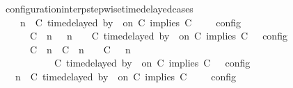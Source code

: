 \begin{isabellebody}
\isamarkupfalse%
%
\endisatagproof
{\isafoldproof}%
%
\isadelimproof
\isanewline
%
\endisadelimproof
\isanewline
{}\isamarkupfalse%
\ configuration{\isacharunderscore}interp{\isacharunderscore}stepwise{\isacharunderscore}timedelayed{\isacharunderscore}cases{\isacharcolon}\isanewline
\ \ {\isacartoucheopen}{\isasymlbrakk}\ {\isasymGamma}{\isacharcomma}\ n\ {\isasymturnstile}\ {\isacharparenleft}{\isacharparenleft}C\ time{\isacharminus}delayed\ by\ {\isasymdelta}{\isasymtau}\ on\ C\ implies\ C\ {\isacharhash}\ {\isasymPsi}{\isacharparenright}\ {\isasymtriangleright}\ {\isasymPhi}\ {\isasymrbrakk}\isactrlsub c\isactrlsub o\isactrlsub n\isactrlsub f\isactrlsub i\isactrlsub g\isanewline
\ \ \ \ {\isacharequal}\ {\isasymlbrakk}\ {\isacharparenleft}{\isacharparenleft}C\ {\isasymnot}{\isasymUp}\ n{\isacharparenright}\ {\isacharhash}\ {\isasymGamma}{\isacharparenright}{\isacharcomma}\ n\ {\isasymturnstile}\ {\isasymPsi}\ {\isasymtriangleright}\ {\isacharparenleft}{\isacharparenleft}C\ time{\isacharminus}delayed\ by\ {\isasymdelta}{\isasymtau}\ on\ C\ implies\ C\ {\isacharhash}\ {\isasymPhi}{\isacharparenright}\ {\isasymrbrakk}\isactrlsub c\isactrlsub o\isactrlsub n\isactrlsub f\isactrlsub i\isactrlsub g\isanewline
\ \ \ \ {\isasymunion}\ {\isasymlbrakk}\ {\isacharparenleft}{\isacharparenleft}C\ {\isasymUp}\ n{\isacharparenright}\ {\isacharhash}\ {\isacharparenleft}C\ {\isacharat}\ n\ {\isasymoplus}\ {\isasymdelta}{\isasymtau}\ {\isasymRightarrow}\ C\ {\isacharhash}\ {\isasymGamma}{\isacharparenright}{\isacharcomma}\ n\isanewline
\ \ \ \ \ \ \ \ {\isasymturnstile}\ {\isasymPsi}\ {\isasymtriangleright}\ {\isacharparenleft}{\isacharparenleft}C\ time{\isacharminus}delayed\ by\ {\isasymdelta}{\isasymtau}\ on\ C\ implies\ C\ {\isacharhash}\ {\isasymPhi}{\isacharparenright}\ {\isasymrbrakk}\isactrlsub c\isactrlsub o\isactrlsub n\isactrlsub f\isactrlsub i\isactrlsub g{\isacartoucheclose}\isanewline
%
\isadelimproof
%
\endisadelimproof
%
\isatagproof
{}\isamarkupfalse%
\ {\isacharminus}\isanewline
\ \ \isamarkupfalse%
\ {}{\isacharcolon}{\isacartoucheopen}{\isasymlbrakk}\ {\isasymGamma}{\isacharcomma}\ n\ {\isasymturnstile}\ {\isacharparenleft}C\ time{\isacharminus}delayed\ by\ {\isasymdelta}{\isasymtau}\ on\ C\ implies\ C\ {\isacharhash}\ {\isasymPsi}\ {\isasymtriangleright}\ {\isasymPhi}\ {\isasymrbrakk}\isactrlsub c\isactrlsub o\isactrlsub n\isactrlsub f\isactrlsub i\isactrlsub g\isanewline

\end{isabellebody}
